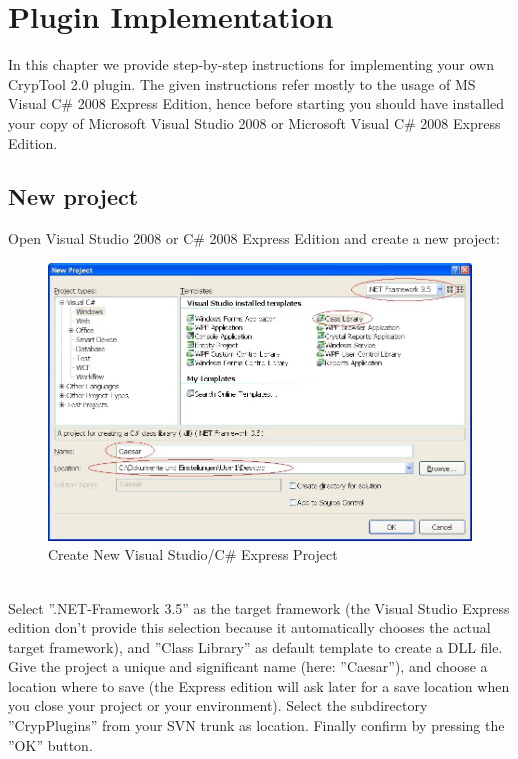 \chapter{Plugin Implementation}
In this chapter we provide step-by-step instructions for implementing your own CrypTool 2.0 plugin. The given instructions refer mostly to the usage of MS Visual C\# 2008 Express Edition, hence before starting you should have installed your copy of Microsoft Visual Studio 2008 or Microsoft Visual C\# 2008 Express Edition.
\section{New project}
\label{sec:CreateANewProjectInVS2008ForYourPlugin}
Open Visual Studio 2008 or C\# 2008 Express Edition and create a new project:\\
\begin{figure}[h!]
	\centering
		\includegraphics[width=1.00\textwidth]{figures/vs_create_new_project.jpg}
	\caption{Create New Visual Studio/C\# Express Project}
	\label{fig:vs_create_new_project}
\end{figure}\\
Select ''.NET-Framework 3.5'' as the target framework (the Visual Studio Express edition don't provide this selection because it automatically chooses the actual target framework), and ''Class Library'' as default template to create a DLL file. Give the project a unique and significant name (here: ''Caesar''), and choose a location where to save (the Express edition will ask later for a save location when you close your project or your environment). Select the subdirectory ''CrypPlugins'' from your SVN trunk as location. Finally confirm by pressing the ''OK'' button.
